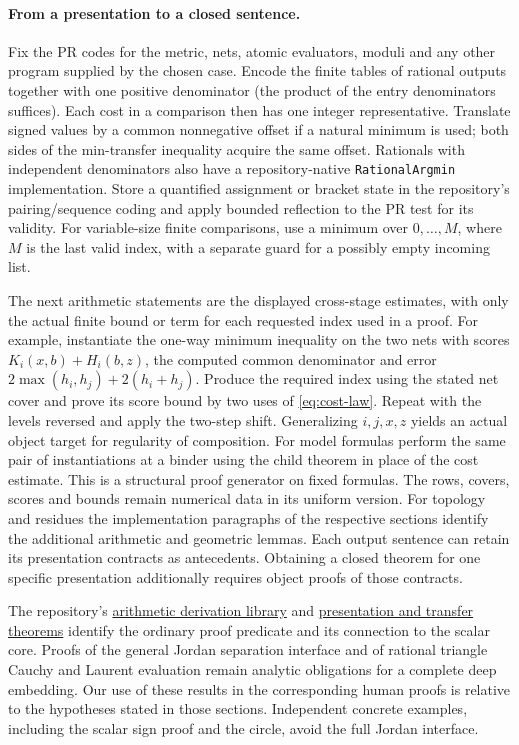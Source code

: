 \paragraph{From a presentation to a closed sentence.}
Fix the PR codes for the metric, nets, atomic evaluators, moduli and any other program supplied by the chosen case. Encode the finite tables of rational outputs together with one positive denominator (the product of the entry denominators suffices). Each cost in a comparison then has one integer representative. Translate signed values by a common nonnegative offset if a natural minimum is used; both sides of the min-transfer inequality acquire the same offset. Rationals with independent denominators also have a repository-native \texttt{RationalArgmin} implementation. Store a quantified assignment or bracket state in the repository's pairing/sequence coding and apply bounded reflection to the PR test for its validity. For variable-size finite comparisons, use a minimum over \(0,\ldots,M\), where \(M\) is the last valid index, with a separate guard for a possibly empty incoming list.

The next arithmetic statements are the displayed cross-stage estimates, with only the actual finite bound or term for each requested index used in a proof. For example, instantiate the one-way minimum inequality on the two nets with scores \(K_i(x,b)+H_i(b,z)\), the computed common denominator and error \(2\max(h_i,h_j)+2(h_i+h_j)\). Produce the required index using the stated net cover and prove its score bound by two uses of \eqref{eq:cost-law}. Repeat with the levels reversed and apply the two-step shift. Generalizing \(i,j,x,z\) yields an actual object target for regularity of composition. For model formulas perform the same pair of instantiations at a binder using the child theorem in place of the cost estimate. This is a structural proof generator on fixed formulas. The rows, covers, scores and bounds remain numerical data in its uniform version. For topology and residues the implementation paragraphs of the respective sections identify the additional arithmetic and geometric lemmas. Each output sentence can retain its presentation contracts as antecedents. Obtaining a closed theorem for one specific presentation additionally requires object proofs of those contracts.

The repository's \href{https://github.com/VladimirReshetnikov/ProveIt/blob/5f3be02388442f16487d2dc5c2529961dd783d2b/Logic/PrimitiveRecursiveArithmetic/Derivations/README.md}{arithmetic derivation library} and \href{https://github.com/VladimirReshetnikov/ProveIt/blob/5f3be02388442f16487d2dc5c2529961dd783d2b/Logic/PrimitiveRecursiveArithmetic/ConciseIPRA/README.md}{presentation and transfer theorems} identify the ordinary proof predicate and its connection to the scalar core. Proofs of the general Jordan separation interface and of rational triangle Cauchy and Laurent evaluation remain analytic obligations for a complete deep embedding. Our use of these results in the corresponding human proofs is relative to the hypotheses stated in those sections. Independent concrete examples, including the scalar sign proof and the circle, avoid the full Jordan interface.

